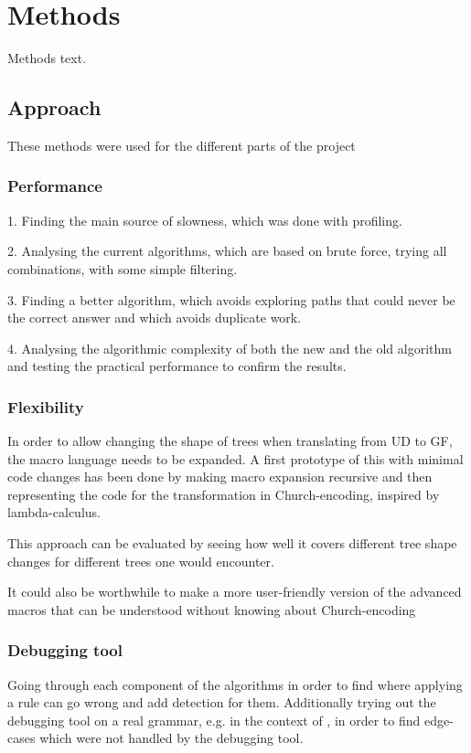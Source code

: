 \chapter{Methods}
Methods text.



\section{Approach}

These methods were used for the different parts of the project

\subsection{Performance}

1. Finding the main source of slowness, which was done with profiling.

2. Analysing the current algorithms, which are based on brute force, trying all combinations, with some simple filtering.

3. Finding a better algorithm, which avoids exploring paths that could never be the correct answer and which avoids duplicate work.

4. Analysing the algorithmic complexity of both the new and the old algorithm and testing the practical performance to confirm the results.

\subsection{Flexibility}

In order to allow changing the shape of trees when translating from UD to GF, the macro language needs to be expanded.
A first prototype of this with minimal code changes has been done by making macro expansion recursive and then representing the code for the transformation in Church-encoding, inspired by lambda-calculus.

This approach can be evaluated by seeing how well it covers different tree shape changes for different trees one would encounter.

It could also be worthwhile to make a more user-friendly version of the advanced macros that can be understood without knowing about Church-encoding

\subsection{Debugging tool}
Going through each component of the algorithms in order to find where applying a rule can go wrong and add detection for them. Additionally trying out the debugging tool on a real grammar, e.g. in the context of \cite{listenmaa-etal-2021-towards}, in order to find edge-cases which were not handled by the debugging tool.

